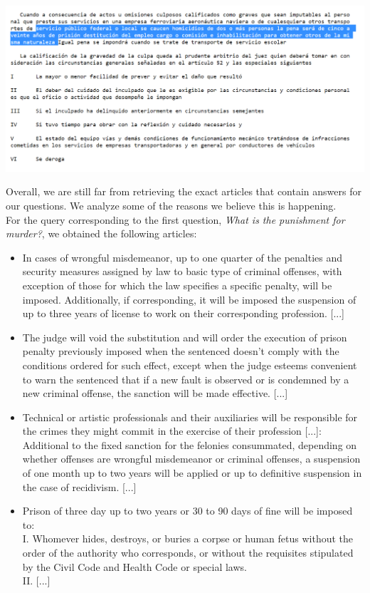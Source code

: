 \documentclass[letterpaper, margin=1in]{article}
\begin{document}
\includegraphics[width=1\textwidth]{Result.png}

\image{} 

Overall, we are still far from retrieving the exact articles that contain answers for our questions. We analyze some of the reasons we believe this is happening. \\

For the query corresponding to the first question, \textit{What is the punishment for murder?}, we obtained the following articles:
\begin{itemize}
\item In cases of wrongful misdemeanor, up to one quarter of the penalties and security measures assigned by law to basic type of criminal offenses, with exception of those for which the law specifies a specific penalty, will be imposed. Additionally, if corresponding, it will be imposed the suspension of up to three years of license to work on their corresponding profession. [...]
\item The judge will void the substitution and will order the execution of prison penalty previously imposed when the sentenced doesn't comply with the conditions ordered for such effect, except when the judge esteems convenient to warn the sentenced that if a new fault is observed or is condemned by a new criminal offense, the sanction will be made effective. [...]
\item Technical or artistic professionals and their auxiliaries will be responsible for the crimes they might commit in the exercise of their profession [...]: \\
Additional to the fixed sanction for the felonies consummated, depending on whether offenses are wrongful misdemeanor or criminal offenses, a suspension of one month up to two years will be applied or up to definitive suspension in the case of recidivism. [...]
\item Prison of three day up to two years or 30 to 90 days of fine will be imposed to: \\
I. Whomever hides, destroys, or buries a corpse or human fetus without the order of the authority who corresponds, or without the requisites stipulated by the Civil Code and Health Code or special laws. \\
II. [...]
\end{itemize}
\end{document}
